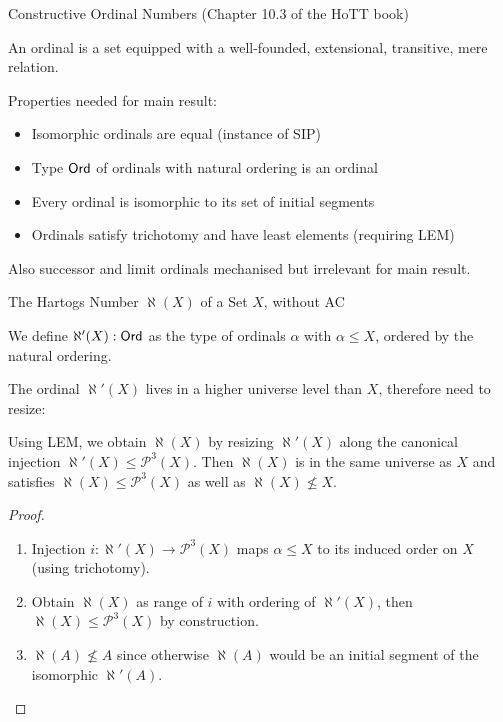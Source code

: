 \documentclass[xcolor=dvipsnames,compress,aspectratio=169]{beamer}
\newcommand{\MCL}[1]{\ensuremath{\mathcal{#1}}\xspace} %
\newcommand{\Pow}{\MCL P}
\begin{document}
\begin{frame}{Constructive Ordinal Numbers (Chapter 10.3 of the HoTT book)}
	\begin{definition}
		An ordinal is a set equipped with a well-founded, extensional, transitive, mere relation.
	\end{definition}

	\pause
	\vspace{0.5cm}
	Properties needed for main result:
	\begin{itemize}
		\vspace{0.2cm}
		\item
		Isomorphic ordinals are equal (instance of SIP)
		\vspace{0.2cm}
		\item
		Type $\mathsf{Ord}$ of ordinals with natural ordering is an ordinal
		\vspace{0.2cm}
		\item
		Every ordinal is isomorphic to its set of initial segments
		\vspace{0.2cm}
		\item
		Ordinals satisfy trichotomy and have least elements (requiring LEM)
	\end{itemize}

	\pause
	\vspace{0.5cm}
	Also successor and limit ordinals mechanised but irrelevant for main result.
\end{frame}

\begin{frame}{The Hartogs Number $\aleph(X)$ of a Set $X$, without AC}
	\pause
	\begin{definition}
		We define $\aleph'(X):\mathsf{Ord}$ as the type of ordinals $\alpha$ with $\alpha \le X$, ordered by the natural ordering.
	\end{definition}

	\pause
	\vspace{0.3cm}
	The ordinal $\aleph'(X)$ lives in a higher universe level than $X$, therefore need to resize:
	\pause
	\begin{theorem}
		Using LEM, we obtain $\aleph(X)$ by resizing $\aleph'(X)$ along the canonical injection $\aleph'(X)\le\Pow^3(X)$.
		Then $\aleph(X)$ is in the same universe as $X$ and satisfies $\aleph(X)\le\Pow^3(X)$ as well as $\aleph(X)\not\le X$.
	\end{theorem}
	\pause
	\begin{proof}
		\begin{enumerate}
			\pause
			\item
			Injection $i: \aleph'(X)\to\Pow^3(X)$ maps $\alpha\le X$ to its induced order on $X$ (using trichotomy).
			\pause
			\item
			Obtain $\aleph(X)$ as range of $i$ with ordering of $\aleph'(X)$, then $\aleph(X)\le\Pow^3(X)$ by construction.
			\pause
			\item
			$\aleph(A)\not\le A$ since otherwise $\aleph(A)$ would be an initial segment of the isomorphic $\aleph'(A)$.
			\qedhere
		\end{enumerate}
	\end{proof}
\end{frame}
\end{document}
